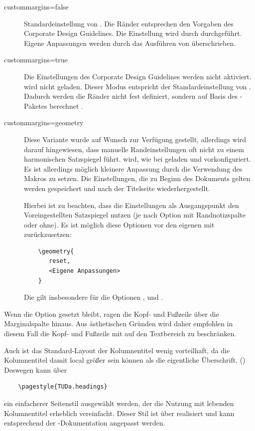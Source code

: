 \begin{description}
\item[custommargins=false] Standardeinstellung von . Die Ränder entsprechen den Vorgaben des Corporate Design Guidelines. Die Einstellung wird durch  durchgeführt. Eigene Anpassungen werden durch das Ausführen von  überschrieben.
\item[custommargins=true] Die Einstellungen des Corporate Design Guidelines werden nicht aktiviert.  wird nicht geladen. Dieser Modus entspricht der Standardeinstellung von \KOMAScript{}. Dadurch werden die Ränder nicht fest definiert, sondern auf Basis des -Paketes berechnet \cite[vgl.][]{scrguide}.
\item[custommargins=geometry]  Diese Variante wurde auf Wunsch zur Verfügung gestellt, allerdings wird darauf hingewiesen, dass manuelle Randeinstellungen oft nicht zu einem harmonischen Satzspiegel führt.
 wird, wie bei  geladen und vorkonfiguriert. Es ist allerdings möglich kleinere Anpassung durch die Verwendung des Makros  zu setzen. Die Einstellungen, die zu Beginn des Dokuments gelten werden gespeichert und nach der Titelseite wiederhergestellt.

Hierbei ist zu beachten, dass die Einstellungen als Ausgangspunkt den Voreingestellten Satzspiegel nutzen (je nach Option mit Randnotizspalte oder ohne). Es ist möglich diese Optionen vor den eigenen mit zurückzusetzen:
\begin{verbatim}
	\geometry{
	   reset,
	   <Eigene Anpassungen>
	}
\end{verbatim}
Die gilt insbesondere für die Optionen ,  und .
\end{description}


Wenn die Option  gesetzt bleibt, ragen die Kopf- und Fußzeile über die Marginalspalte hinaus. Aus ästhetischen Gründen wird daher empfohlen in diesem Fall die Kopf- und Fußzeile  mit   auf den Textbereich zu beschränken.

Auch ist das Standard-Layout der Kolumnentitel wenig vorteilhaft, da die Kolumnentitel damit local größer sein können als die eigentliche Überschrift. ()
Deswegen kann über
\begin{verbatim}
	\pagestyle{TUDa.headings}
\end{verbatim}
ein einfacherer Seitenstil ausgewählt werden, der die Nutzung mit lebenden Kolumnentitel erheblich vereinfacht. Dieser Stil ist über  realisiert und kann entsprechend der \KOMAScript{}-Dokumentation angepasst werden.

